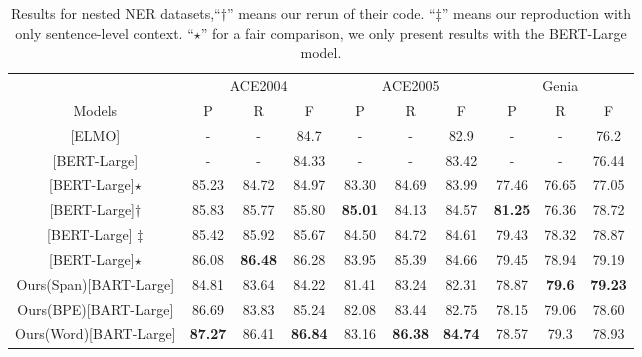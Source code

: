 \documentclass[11pt,a4paper]{article}
\begin{document}
\begin{table*}[ht]
  \centering
  \setlength{\tabcolsep}{2pt}
  \begin{tabular}{c|ccc|ccc|ccc}
\toprule
    & \multicolumn{3}{c|}{ACE2004} & \multicolumn{3}{c|}{ACE2005} & \multicolumn{3}{c}{Genia} \\
   Models & P       & R       & F       & P       & R       & F       & P       & R      & F      \\
\midrule
  \citet{DBLP:conf/naacl/LuanWHSOH19}[ELMO]       & -       & -       & 84.7    & -       & -       & 82.9    & -       & -      & 76.2   \\
  \citet{DBLP:conf/acl/StrakovaSH19}[BERT-Large] & -       & -       & 84.33   & -       & -       & 83.42   & -       & -      & 76.44  \\
  \citet{DBLP:journals/tacl/ShibuyaH20}[BERT-Large]$\star$ & 85.23 &  84.72 & 84.97      & 83.30   & 84.69   & 83.99   & 77.46   & 76.65  & 77.05  \\
  \citet{DBLP:conf/acl/LiFMHWL20}[BERT-Large]$\dagger$ & 85.83   & 85.77   &  85.80  & \textbf{85.01}   & 84.13   & 84.57   & \textbf{81.25}   & 76.36  &  78.72 \\
  \citet{DBLP:conf/acl/YuBP20}[BERT-Large] $\ddagger$  & 85.42   & 85.92   & 85.67   & 84.50   & 84.72   & 84.61   & 79.43   & 78.32  & 78.87  \\
  \citet{DBLP:conf/acl/WangSCC20}[BERT-Large]$\star$     & 86.08   & \textbf{86.48}   & 86.28   & 83.95   & 85.39   & 84.66   & 79.45   & 78.94  & 79.19  \\
\midrule
  Ours(Span)[BART-Large]                          & 84.81   & 83.64   & 84.22   & 81.41   & 83.24   & 82.31   & 78.87   & \textbf{79.6}   & \textbf{79.23}  \\
  Ours(BPE)[BART-Large] & 86.69   & 83.83   & 85.24   & 82.08   & 83.44   & 82.75   & 78.15   & 79.06  & 78.60  \\
  Ours(Word)[BART-Large] & \textbf{87.27}   & 86.41   & \textbf{86.84}   & 83.16   & \textbf{86.38}   & \textbf{84.74}   & 78.57   & 79.3   & 78.93  \\
\bottomrule
  \end{tabular}
  \caption{Results for nested NER datasets,``$\dagger$'' means our rerun of their code. ``$\ddagger$'' means our reproduction with only sentence-level context. ``$\star$'' for a fair comparison, we only present results with the BERT-Large model.}
  \label{tb:nested_ner}
\end{table*}
\end{document}
